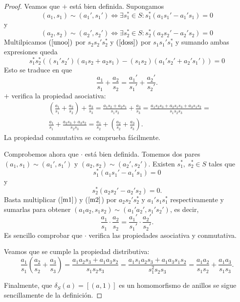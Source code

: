 \documentclass[../main.tex]{subfiles}
\begin{document}
	\begin{proof}
		Veamos que $+$ está bien definida. Supongamos\begin{equation}\label{unoo}
		(a_1,s_1)\sim (a_1',s_1')\iff \exists s_1^{\ast}\in S : s_1^{\ast}(a_1s_1'-a_1's_1)=0
		\end{equation} y \begin{equation}\label{doss}
		(a_2,s_2)\sim (a_2',s_2')\iff \exists s_2^{\ast}\in S : s_2^{\ast}(a_2s_2'-a_2's_2)=0
		\end{equation}
		Multilpicamos $(\ref{unoo})$ por $s_2s_2's_2^{\ast}$ y $(\ref{doss})$ por $s_1s_1's_1^{\ast}$ y sumando ambas expresiones queda $$s_1^{\ast}s_2^{\ast}((s_1's_2')(a_1s_2+a_2s_1)-(s_1s_2)(a_1's_2'+a_2's_1'))=0$$ Esto se traduce en que $$\frac{a_1}{s_1} + \frac{a_2}{s_2}=\frac{a_1'}{s_1'} + \frac{a_2'}{s_2'}.$$
		$+$ verifica la propiedad asociativa:
		\begin{align*}
		&\left(\frac{a_1}{s_1}+\frac{a_2}{s_2}\right)+\frac{a_3}{s_3}=\frac{a_1s_2+a_2s_1}{s_1s_2}+\frac{a_3}{s_3}=\frac{a_1s_2s_3+a_2s_1s_3+a_3s_1s_2}{s_1s_2s_3}=\\&\frac{a_1}{s_1}+\frac{a_2s_3+a_3s_2}{s_2s_3}=\frac{a_1}{s_2}+\left(\frac{a_2}{s_2}+\frac{a_3}{s_3}\right).
		\end{align*}
		La propiedad conmutativa se comprueba fácilmente.

		Comprobemos ahora que $·$ está bien definida. Tomemos dos pares $(a_1,s_1)\sim(a_1',s_1')$ y $(a_2,s_2)\sim(a_2',s_2')$. Existen $s_1^*,\ s_2^*\in S$ tales que
		\begin{equation}\label{m1}
		s_1^{\ast}(a_1s_1'-a_1's_1)=0
		\end{equation} y \begin{equation}\label{m2}
		s_2^{\ast}(a_2s_2'-a_2's_2)=0.
		\end{equation}
		Basta multiplicar ($\ref{m1}$) y ($\ref{m2}$) por $a_2s_2's_2^*$ y $a_1's_1s_1^*$ respectivamente y sumarlas para obtener $(a_1a_2,s_1s_2)\sim(a_1'a_2',s_1's_2')$, es decir,
		$$\frac{a_1}{s_1}·\frac{a_2}{s_2}=\frac{a_1'}{s_1'}·\frac{a_2'}{s_2'}.$$
		Es sencillo comprobar que $\cdot$ verifica las propiedades asociativa y conmutativa.

		Veamos que se cumple la propiedad distributiva:$$\frac{a_1}{s_1}\left(\frac{a_2}{s_2}+\frac{a_3}{s_3}\right)=\frac{a_1a_2s_3+a_1a_3s_2}{s_1s_2s_3}=\frac{a_1s_1a_2s_3+a_1a_3s_1s_2}{s_1^2s_2s_3}=\frac{a_1a_2}{s_1s_2}+\frac{a_1a_3}{s_1s_3}.$$

		Finalmente, que $\delta_S(a)=[(a,1)]$ es un homomorfismo de anillos se sigue sencillamente de la definición.
	\end{proof}
\end{document}
